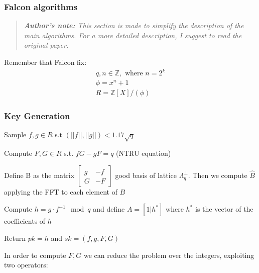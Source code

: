 \subsubsection{Falcon algorithms}

\begin{quotation}
    \textit{\textbf{Author's note:} This section is made to simplify the description of the main algorithms. For a more detailed description, I suggest to read the original paper.}
\end{quotation}
\bigskip

\noindent
Remember that Falcon fix:
\begin{align*}
    q, n \in \mathbb{Z}, \text{ where } n = 2^k\\
    \phi = x^n + 1\\
    R = \mathbb{Z}[X]/(\phi)
\end{align*}

\subsubsection*{Key Generation}
\begin{algorithm}
\begin{algorithmic}[1]
    \State Sample $f, g \in R$ s.t $(||f||, ||g||) < 1.17 \sqrt{q}$

    \State Compute $F, G \in R$ s.t. $fG - gF  = q$ (NTRU equation)

    \State Define B as the matrix $\left[ \begin{array}{c|c}
        g & -f \\
        \hline
        G & -F
    \end{array} \right]$ good basis of lattice $\Lambda_q^\bot$.
    Then we compute $\hat{B}$ applying the FFT to each element of $B$ 

    \State Compute $h = g \cdot f^{-1} \mod q$ and define $A = [1 | h^*]$ where $h^*$ is the vector of the coefficients of $h$

    \State Return $pk = h$ and $sk = (f, g, F, G)$
    
\end{algorithmic}
\end{algorithm}

\noindent
In order to compute $F, G$  we can reduce the problem over the integers, exploiting two operators:

